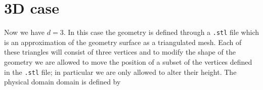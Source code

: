 \section{3D case}

Now we have $d=3$.
In this case the geometry is defined through a \verb|.stl| file which is an approximation of the geometry surface as a triangulated mesh. Each of these triangles will consist of three vertices and to modify the shape of the geometry we are allowed to move the position of a subset of the vertices defined in the \verb*|.stl| file; in particular we are only allowed to alter their height. The physical domain domain is defined by